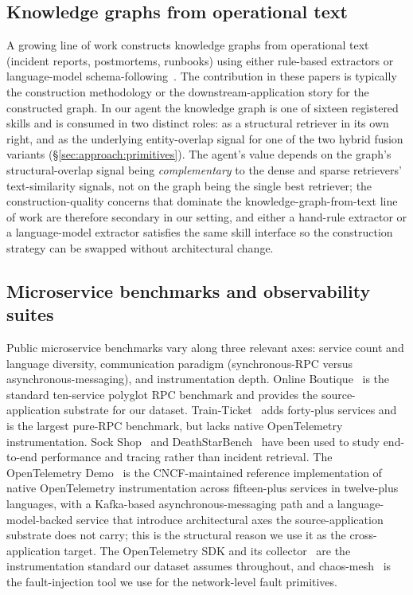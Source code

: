 \subsection{Knowledge graphs from operational text}
\label{sec:related:kg}

A growing line of work constructs knowledge graphs from operational text (incident reports, postmortems, runbooks) using either rule-based extractors or language-model schema-following~\cite{kg-from-text,llm-kg-extraction,incident-kg}. The contribution in these papers is typically the construction methodology or the downstream-application story for the constructed graph. In our agent the knowledge graph is one of sixteen registered skills and is consumed in two distinct roles: as a structural retriever in its own right, and as the underlying entity-overlap signal for one of the two hybrid fusion variants (\S\ref{sec:approach:primitives}). The agent's value depends on the graph's structural-overlap signal being \emph{complementary} to the dense and sparse retrievers' text-similarity signals, not on the graph being the single best retriever; the construction-quality concerns that dominate the knowledge-graph-from-text line of work are therefore secondary in our setting, and either a hand-rule extractor or a language-model extractor satisfies the same skill interface so the construction strategy can be swapped without architectural change.

\subsection{Microservice benchmarks and observability suites}
\label{sec:related:benchmarks}

Public microservice benchmarks vary along three relevant axes: service count and language diversity, communication paradigm (synchronous-RPC versus asynchronous-messaging), and instrumentation depth. Online Boutique~\cite{onlineboutique} is the standard ten-service polyglot RPC benchmark and provides the source-application substrate for our dataset. Train-Ticket~\cite{trainticket} adds forty-plus services and is the largest pure-RPC benchmark, but lacks native OpenTelemetry instrumentation. Sock Shop~\cite{sockshop} and DeathStarBench~\cite{deathstarbench} have been used to study end-to-end performance and tracing rather than incident retrieval. The OpenTelemetry Demo~\cite{otel-demo} is the CNCF-maintained reference implementation of native OpenTelemetry instrumentation across fifteen-plus services in twelve-plus languages, with a Kafka-based asynchronous-messaging path and a language-model-backed service that introduce architectural axes the source-application substrate does not carry; this is the structural reason we use it as the cross-application target. The OpenTelemetry SDK and its collector~\cite{otel-spec} are the instrumentation standard our dataset assumes throughout, and chaos-mesh~\cite{chaosmesh} is the fault-injection tool we use for the network-level fault primitives.
